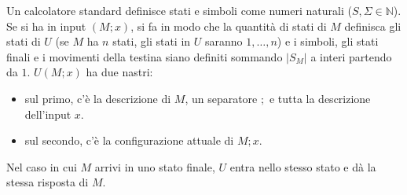 Un calcolatore standard definisce stati e simboli come numeri naturali ($S, \Sigma \in \mathbb{N}$).
Se si ha in input $(M; x)$, si fa in modo che la quantità di stati di $M$ definisca gli stati di $U$ (se $M$ ha $n$ stati, gli stati in $U$ saranno $1, \dots, n$) e i simboli, gli stati finali e i movimenti della testina siano definiti sommando $|S_M|$ a interi partendo da $1$. 
$U(M;x)$ ha due nastri: 
\begin{itemize}
    \item sul primo, c’è la descrizione di $M$, un separatore $;$ e tutta la descrizione dell’input $x$.
    \item sul secondo, c’è la configurazione attuale di $M;x$. 
\end{itemize}
Nel caso in cui $M$ arrivi in uno stato finale, $U$ entra nello stesso stato e dà la stessa risposta di $M$.